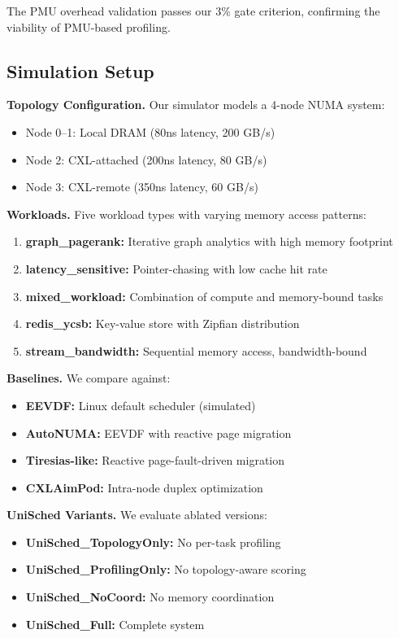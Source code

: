 \documentclass[11pt]{article}
\begin{document}
The PMU overhead validation passes our 3\% gate criterion, confirming the viability of PMU-based profiling.

\subsection{Simulation Setup}

\textbf{Topology Configuration.} Our simulator models a 4-node NUMA system:
\begin{itemize}
    \item Node 0--1: Local DRAM (80ns latency, 200 GB/s)
    \item Node 2: CXL-attached (200ns latency, 80 GB/s)
    \item Node 3: CXL-remote (350ns latency, 60 GB/s)
\end{itemize}

\textbf{Workloads.} Five workload types with varying memory access patterns:
\begin{enumerate}
    \item \textbf{graph\_pagerank:} Iterative graph analytics with high memory footprint
    \item \textbf{latency\_sensitive:} Pointer-chasing with low cache hit rate
    \item \textbf{mixed\_workload:} Combination of compute and memory-bound tasks
    \item \textbf{redis\_ycsb:} Key-value store with Zipfian distribution
    \item \textbf{stream\_bandwidth:} Sequential memory access, bandwidth-bound
\end{enumerate}

\textbf{Baselines.} We compare against:
\begin{itemize}
    \item \textbf{EEVDF:} Linux default scheduler (simulated)
    \item \textbf{AutoNUMA:} EEVDF with reactive page migration
    \item \textbf{Tiresias-like:} Reactive page-fault-driven migration
    \item \textbf{CXLAimPod:} Intra-node duplex optimization
\end{itemize}

\textbf{UniSched Variants.} We evaluate ablated versions:
\begin{itemize}
    \item \textbf{UniSched\_TopologyOnly:} No per-task profiling
    \item \textbf{UniSched\_ProfilingOnly:} No topology-aware scoring
    \item \textbf{UniSched\_NoCoord:} No memory coordination
    \item \textbf{UniSched\_Full:} Complete system
\end{itemize}
\end{document}
